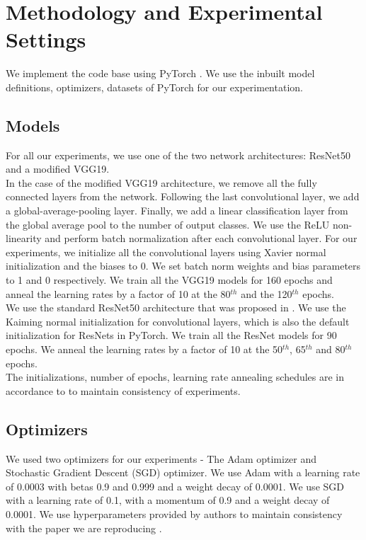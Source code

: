     
    \section{Methodology and Experimental Settings}
    \label{sec:method}
    We implement the code base using PyTorch \cite{pytorch}. We use the inbuilt model definitions, optimizers, datasets of PyTorch for our experimentation.
    
    \subsection{Models}
    \label{subsec:models}
    For all our experiments, we use one of the two network  architectures: ResNet50 and a modified VGG19.\\
    
    In the case of the modified VGG19 architecture, we remove all the fully connected layers from the network. Following the last convolutional layer, we add a global-average-pooling layer. Finally, we add a linear classification layer from the global average pool to the number of output classes. We use the ReLU non-linearity and perform batch normalization after each convolutional layer. For our experiments, we initialize all the convolutional layers using Xavier normal initialization and the biases to 0. We set batch norm weights and bias parameters to 1 and 0 respectively. We train all the VGG19 models for 160 epochs and anneal the learning rates
    by a factor of 10 at the 80$^{th}$ and the 120$^{th}$ epochs.\\ 
    
    We use the standard ResNet50 architecture that was proposed in \cite{DBLP:journals/corr/HeZRS15}. We use the Kaiming normal initialization for convolutional layers, which is also the default initialization for ResNets in PyTorch. We train all the ResNet models for 90 epochs. We anneal the learning rates by a factor of 10 at the 50$^{th}$, 65$^{th}$ and 80$^{th}$ epochs. \\
    
    The initializations, number of epochs, learning rate annealing schedules are in accordance to \cite{repro_paper} to maintain consistency of experiments.
    
    \subsection{Optimizers}
    We used two optimizers for our experiments - The Adam optimizer and Stochastic Gradient Descent (SGD) optimizer. We use Adam with a learning rate of 0.0003 with betas 0.9 and 0.999 and a weight decay of 0.0001. We use SGD with a learning rate of 0.1, with a momentum of 0.9 and a weight decay of 0.0001. We use hyperparameters provided by authors to maintain consistency with the paper we are reproducing \cite{repro_paper}.
    

